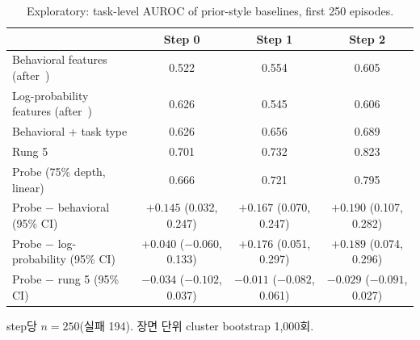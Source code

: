 \begin{table}[htbp]
\centering\small
\caption{Exploratory: task-level AUROC of prior-style baselines, first 250 episodes.}\label{tab:prior}
\begin{tabularx}{\linewidth}{@{}Lccc@{}}
\toprule
 & Step 0 & Step 1 & Step 2 \\
\midrule
Behavioral features (after~\cite{ruan2026doomed}) & 0.522 & 0.554 & 0.605 \\
Log-probability features (after~\cite{pham2026agentstop}) & 0.626 & 0.545 & 0.606 \\
Behavioral + task type & 0.626 & 0.656 & 0.689 \\
Rung 5 & 0.701 & 0.732 & 0.823 \\
Probe (75\% depth, linear) & 0.666 & 0.721 & 0.795 \\
\addlinespace
Probe $-$ behavioral (95\% CI) & $+0.145$ (0.032, 0.247) & $+0.167$ (0.070, 0.247) & $+0.190$ (0.107, 0.282) \\
Probe $-$ log-probability (95\% CI) & $+0.040$ ($-0.060$, 0.133) & $+0.176$ (0.051, 0.297) & $+0.189$ (0.074, 0.296) \\
Probe $-$ rung 5 (95\% CI) & $-0.034$ ($-0.102$, 0.037) & $-0.011$ ($-0.082$, 0.061) & $-0.029$ ($-0.091$, 0.027) \\
\bottomrule
\end{tabularx}
\par\smallskip\raggedright\footnotesize
step당 $n = 250$(실패 194). 장면 단위 cluster bootstrap 1,000회.
\end{table}
